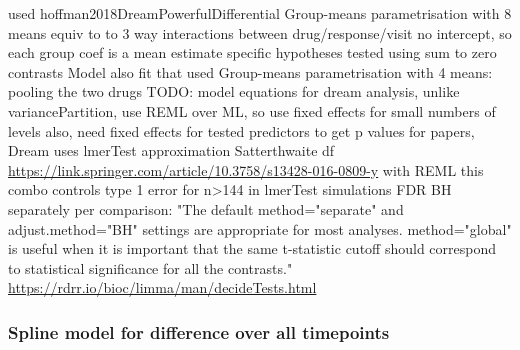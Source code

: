 \begin{outline}
\1 used  hoffman2018DreamPowerfulDifferential
\1 Group-means parametrisation with 8 means
    \2 equiv to to 3 way interactions between drug/response/visit
    \2 no intercept, so each group coef is a mean estimate
\1 specific hypotheses tested using sum to zero contrasts 
\1 Model also fit that used Group-means parametrisation with 4 means: pooling the two drugs
\1 TODO: model equations
    \2 for dream analysis, unlike variancePartition, use REML over ML, so use fixed effects for small numbers of levels
    \2 also, need fixed effects for tested predictors
    \2 to get p values for papers, Dream uses lmerTest approximation Satterthwaite df \url{https://link.springer.com/article/10.3758/s13428-016-0809-y} with REML
    \2 this combo controls type 1 error for n>144 in lmerTest simulations
    \2 FDR BH separately per comparison: "The default method="separate" and adjust.method="BH" settings are appropriate for most analyses. method="global" is useful when it is important that the same t-statistic cutoff should correspond to statistical significance for all the contrasts." \url{https://rdrr.io/bioc/limma/man/decideTests.html}

\subsubsection{Spline model for difference over all timepoints}



\end{outline}
